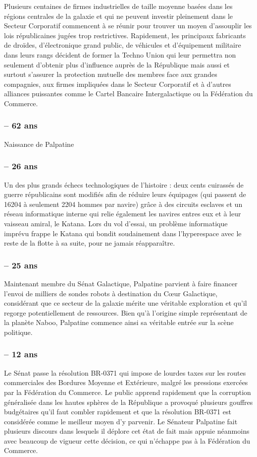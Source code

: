 \documentclass[twoside]{article}
\begin{document}
Plusieurs centaines de firmes industrielles de taille moyenne basées dans les régions centrales de la galaxie et qui ne peuvent investir pleinement dans le Secteur Corporatif commencent à se réunir pour trouver un moyen d'assouplir les lois républicaines jugées trop restrictives. Rapidement, les principaux fabricants de droïdes, d'électronique grand public, de véhicules et d'équipement militaire dans leurs rangs décident de former la Techno Union qui leur permettra non seulement d'obtenir plus d'influence auprès de la République mais aussi et surtout s'assurer la protection mutuelle des membres face aux grandes compagnies, aux firmes impliquées dans le Secteur Corporatif et à d'autres alliances puissantes comme le Cartel Bancaire Intergalactique ou la Fédération du Commerce.
\subsubsection*{-- 62 ans} 
Naissance de Palpatine

\subsubsection*{-- 26 ans} 
Un des plus grands échecs technologiques de l'histoire : deux cents cuirassés de guerre républicains sont modifiés afin de réduire leurs équipages (qui passent de 16204 à seulement 2204 hommes par navire) grâce à des circuits esclaves et un réseau informatique interne qui relie également les navires entres eux et à leur vaisseau amiral, le Katana. Lors du vol d'essai, un problème informatique imprévu frappe le Katana qui bondit soudainement dans l'hyperespace avec le reste de la flotte à sa suite, pour ne jamais réappara\^{i}tre.

\subsubsection*{-- 25 ans} 
Maintenant membre du Sénat Galactique, Palpatine parvient à faire financer l'envoi de milliers de sondes robots à destination du C\oe ur Galactique, considérant que ce secteur de la galaxie mérite une véritable exploration et qu'il regorge potentiellement de ressources. Bien qu'à l'origine simple représentant de la planète Naboo, Palpatine commence ainsi sa véritable entrée sur la scène politique.

\subsubsection*{-- 12 ans} 
Le Sénat passe la résolution BR-0371 qui impose de lourdes taxes sur les routes commerciales des Bordures Moyenne et Extérieure, malgré les pressions exercées par la Fédération du Commerce. Le public apprend rapidement que la corruption généralisée dans les hautes sphères de la République a provoqué plusieurs gouffres budgétaires qu'il faut combler rapidement et que la résolution BR-0371 est considérée comme le meilleur moyen d'y parvenir. Le Sénateur Palpatine fait plusieurs discours dans lesquels il déplore cet état de fait mais appuie néanmoins avec beaucoup de vigueur cette décision, ce qui n'échappe pas à la Fédération du Commerce. \\
\end{document}
